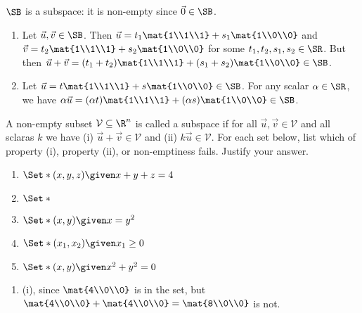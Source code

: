 \begin{exercises}
\begin{problist}
\begin{solution}
\begin{enumerate}
$\SB$ is a subspace: it is non-empty since $\vec 0\in\SB$. 
				\begin{enumerate}
					\item Let $\vec u,\vec v\in \SB$. Then $\vec u=t_1\mat{1\\1\\1}+s_1\mat{1\\0\\0}$ and $\vec v=t_2\mat{1\\1\\1}+s_2\mat{1\\0\\0}$ for some $t_1,t_2,s_1,s_2\in\SR$. But then $\vec u+\vec v=(t_1+t_2)\mat{1\\1\\1}+(s_1+s_2)\mat{1\\0\\0}\in \SB$.
					\item Let $\vec u=t\mat{1\\1\\1}+s\mat{1\\0\\0}\in\SB$. For any scalar $\alpha\in\SR$, we have $\alpha\vec u=(\alpha t)\mat{1\\1\\1}+(\alpha s)\mat{1\\0\\0}\in\SB$.
				\end{enumerate}
			\end{enumerate}
		\end{solution}
		
		\prob
		A non-empty subset $\mathcal V \subseteq \R^n$ is called a subspace if
		for all $\vec u, \vec v \in \mathcal V$ and all sclaras $k$ we have
			(i) $\vec u + \vec v \in \mathcal V$ and
			(ii) $k\vec u \in \mathcal V$.
			For each set below, list which of property (i), property (ii), or non-emptiness fails.
			Justify your answer.
		\begin{enumerate}
			\item $\Set*{(x,y,z)\given x+y+z=4}$
			\item $\Set*{}$
			\item $\Set*{(x,y)\given x=y^2}$
			\item $\Set*{(x_1,x_2)\given x_1 \geq 0}$
			\item $\Set*{(x,y)\given x^2+y^2=0}$
		\end{enumerate}
		\begin{solution}
			\begin{enumerate}
				\item (i), since $\mat{4\\0\\0}$ is in the set, but $\mat{4\\0\\0}+\mat{4\\0\\0}=\mat{8\\0\\0}$ is not.


\end{enumerate}
\end{solution}
\end{problist}
\end{exercises}
